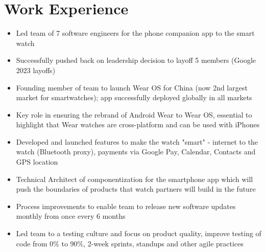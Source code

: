\documentclass[11pt,a4paper]{moderncv}
\begin{document}
\makecvtitle

\section{Work Experience}
{\begin{itemize}
        \item Led team of 7 software engineers for the phone companion app to the
          smart watch
        \item Successfully pushed back on leadership decision to layoff 5 members (Google 2023 layoffs)
        \item  Founding member of team to launch Wear OS for China (now 2nd largest
market for smartwatches); app successfully deployed globally in all markets
        \item Key role in ensuring the rebrand of Android Wear to Wear OS, essential to
highlight that Wear watches are cross-platform and can be used with iPhones
        \item Developed and launched features to make the watch "smart" - internet to
the watch (Bluetooth proxy), payments via Google Pay, Calendar, Contacts
and GPS location
        \item Technical Architect of componentization for the smartphone app which will
  push the boundaries of products that watch partners will build in the future
        \item Process improvements to enable team to release new software updates
          monthly from once every 6 months
        \item Led team to a testing culture and focus on product quality, improve testing
of code from 0\% to 90\%, 2-week sprints, standups and other agile practices
\end{itemize}}
\end{document}
